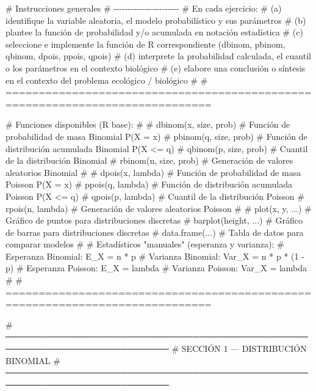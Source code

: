 \documentclass[
  spanish,
  letterpaper,
  DIV=11,
  numbers=noendperiod]{scrreprt}
\newenvironment{Shaded}{\begin{snugshade}}{\end{snugshade}}
\newcommand{\CommentTok}[1]{\textcolor[rgb]{0.37,0.37,0.37}{#1}}
\begin{document}
\begin{Shaded}
\begin{Highlighting}[]

\CommentTok{\#  Instrucciones generales}
\CommentTok{\#  {-}{-}{-}{-}{-}{-}{-}{-}{-}{-}{-}{-}{-}{-}{-}{-}{-}{-}{-}{-}{-}{-}{-}}
\CommentTok{\#  En cada ejercicio:}
\CommentTok{\#    (a) identifique la variable aleatoria, el modelo probabilístico y sus parámetros}
\CommentTok{\#    (b) plantee la función de probabilidad y/o acumulada en notación estadística}
\CommentTok{\#    (c) seleccione e implemente la función de R correspondiente (dbinom, pbinom, qbinom, dpois, ppois, qpois)}
\CommentTok{\#    (d) interprete la probabilidad calculada, el cuantil o los parámetros en el contexto biológico}
\CommentTok{\#    (e) elabore una conclusión o síntesis en el contexto del problema ecológico / biológico}
\CommentTok{\#}
\CommentTok{\# =============================================================================}

\CommentTok{\#  Funciones disponibles (R base):}
\CommentTok{\#}
\CommentTok{\#    dbinom(x, size, prob)   \# Función de probabilidad de masa Binomial P(X = x)}
\CommentTok{\#    pbinom(q, size, prob)   \# Función de distribución acumulada Binomial P(X \textless{}= q)}
\CommentTok{\#    qbinom(p, size, prob)   \# Cuantil de la distribución Binomial}
\CommentTok{\#    rbinom(n, size, prob)   \# Generación de valores aleatorios Binomial}
\CommentTok{\#}
\CommentTok{\#    dpois(x, lambda)        \# Función de probabilidad de masa Poisson P(X = x)}
\CommentTok{\#    ppois(q, lambda)        \# Función de distribución acumulada Poisson P(X \textless{}= q)}
\CommentTok{\#    qpois(p, lambda)        \# Cuantil de la distribución Poisson}
\CommentTok{\#    rpois(n, lambda)        \# Generación de valores aleatorios Poisson}
\CommentTok{\#}
\CommentTok{\#    plot(x, y, ...)         \# Gráfico de puntos para distribuciones discretas}
\CommentTok{\#    barplot(height, ...)    \# Gráfico de barras para distribuciones discretas}
\CommentTok{\#    data.frame(...)         \# Tabla de datos para comparar modelos}
\CommentTok{\#}
\CommentTok{\#  Estadísticos "manuales" (esperanza y varianza):}
\CommentTok{\#    Esperanza Binomial:  E\_X = n * p}
\CommentTok{\#    Varianza Binomial:   Var\_X = n * p * (1 {-} p)}
\CommentTok{\#    Esperanza Poisson:   E\_X = lambda}
\CommentTok{\#    Varianza Poisson:    Var\_X = lambda}
\CommentTok{\#}
\CommentTok{\# =============================================================================}


\CommentTok{\# ─────────────────────────────────────────────────────────────────────────────}
\CommentTok{\#  SECCIÓN 1 — DISTRIBUCIÓN BINOMIAL}
\CommentTok{\# ─────────────────────────────────────────────────────────────────────────────}


\end{Highlighting}
\end{Shaded}
\end{document}
